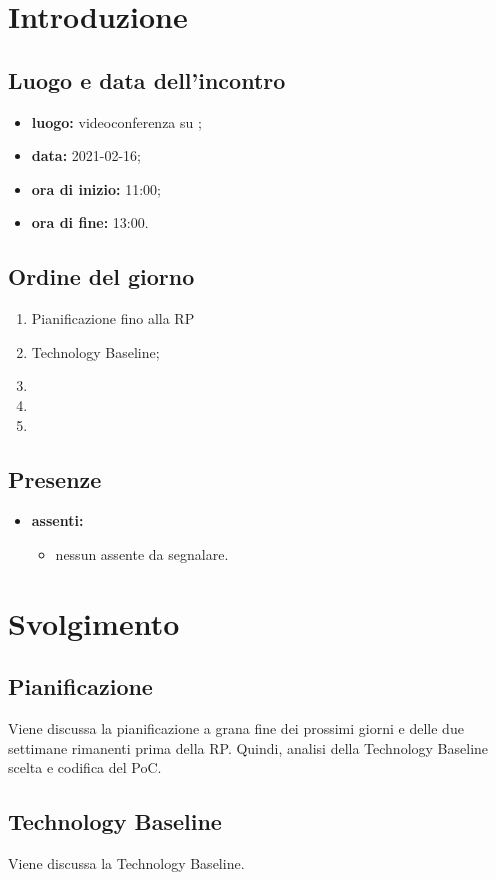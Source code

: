 \section*{Introduzione}
\subsection*{Luogo e data dell'incontro}
\begin{itemize}
\item \textbf{luogo:} videoconferenza su ;
\item \textbf{data:} 2021-02-16;
\item \textbf{ora di inizio:} 11:00;
\item \textbf{ora di fine:} 13:00.
\end{itemize}

\subsection*{Ordine del giorno}
\begin{enumerate}
	\item Pianificazione fino alla RP
	\item Technology Baseline;
	\item
	\item
	\item 
\end{enumerate}

\subsection*{Presenze}
\begin{itemize}
	\item \textbf{assenti:}
	\begin{itemize}
	\item nessun assente da segnalare.
	\end{itemize}
\end{itemize}

\section*{Svolgimento}
\subsection*{Pianificazione}
Viene discussa la pianificazione a grana fine dei prossimi giorni e delle due settimane rimanenti prima della RP. Quindi, analisi della Technology Baseline scelta e codifica del PoC. 
\subsection*{Technology Baseline}
Viene discussa la Technology Baseline.

